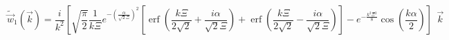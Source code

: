 \documentclass[letterpaper,twocolumn,amsmath,amssymb,prb]{revtex4-1}
\begin{document}
\begin{widetext}



\begin{equation}{\widetilde{\vec{w}}_1(\vec{k})=\frac{i}{k^2}\left[\sqrt{\frac{\pi}{2}}\frac{1}{k\Xi}e^{-\left(\frac{\alpha}{\sqrt{2}\Xi}\right)^2}\left[\operatorname{erf}\left(\frac{k\Xi}{2\sqrt{2}}+\frac{i\alpha}{\sqrt{2}\Xi}\right)+\operatorname{erf}\left(\frac{k\Xi}{2\sqrt{2}}-\frac{i\alpha}{\sqrt{2}\Xi}\right)\right]-e^{-\frac{k^2\Xi^2}{8}}\cos\left(\frac{k\alpha}{2}\right)\right]{~~}\vec{k}}\end{equation}
\[{}\]


\end{widetext}
\end{document}
